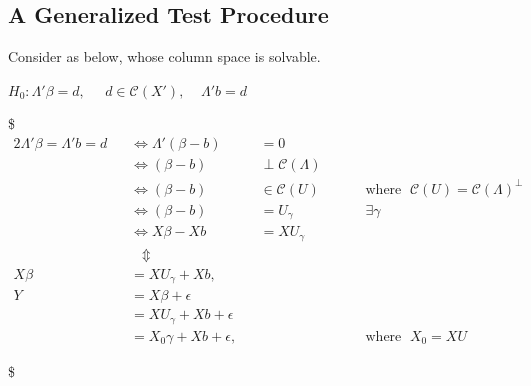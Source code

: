 \documentclass[
]{book}
\begin{document}
{{{\hypertarget{a-generalized-test-procedure-1}{%
\subsection{A Generalized Test Procedure}\label{a-generalized-test-procedure-1}}

Consider as below, whose column space is solvable.

\(H_0: \Lambda' \beta = d, \; \; \; \; \; d \in \mathcal{C}(X'), \; \; \; \; \Lambda' b =d\)

\$
\begin{alignat}{2}




\Lambda ' \beta = 

\Lambda ' b =  d



 \; \; \; &\iff \Lambda ' (\beta - b) &&= 0





\\

&\iff (\beta - b) &&\perp \mathcal{C}(\Lambda)

\\

&\iff (\beta - b) &&\in \mathcal{C}(U) \; \; \; \; \; \; &&\text{where } \; \mathcal{C}(U) = \mathcal{C}(\Lambda)^\perp

\\

&\iff (\beta - b) &&= U_\gamma &&\exists \gamma


\\

&\iff X\beta - Xb &&= XU_\gamma

\\

& \; \; \; \Updownarrow

\\

X\beta  &= XU_\gamma + Xb, \\

Y &= X \beta + \epsilon \\
&= X U_\gamma + Xb + \epsilon \\
&= X_0 \gamma + Xb + \epsilon, && && \text{where } \; X_0 = XU








\end{alignat}

\$

}}}
\end{document}
